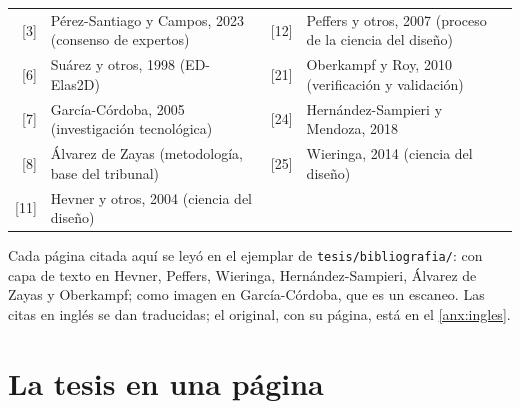 \documentclass[11pt,a4paper]{article}
\newcommand{\fte}[1]{\textcolor{tinta3}{#1}}
\begin{document}
\begin{center}\small
\begin{tabularx}{\linewidth}{@{}rXrX@{}}
\toprule
{[3]} & Pérez-Santiago y Campos, 2023 (consenso de expertos) & {[12]} & Peffers y otros, 2007 (proceso de la ciencia del diseño)\\
{[6]} & Suárez y otros, 1998 (ED-Elas2D) & {[21]} & Oberkampf y Roy, 2010 (verificación y validación)\\
{[7]} & García-Córdoba, 2005 (investigación tecnológica) & {[24]} & Hernández-Sampieri y Mendoza, 2018\\
{[8]} & Álvarez de Zayas (metodología, base del tribunal) & {[25]} & Wieringa, 2014 (ciencia del diseño)\\
{[11]} & Hevner y otros, 2004 (ciencia del diseño) & & \\
\bottomrule
\end{tabularx}
\end{center}

\fte{Cada página citada aquí se leyó en el ejemplar de \texttt{tesis/bibliografia/}: con capa de texto en Hevner, Peffers, Wieringa, Hernández-Sampieri, Álvarez de Zayas y Oberkampf; como imagen en García-Córdoba, que es un escaneo. Las citas en inglés se dan traducidas; el original, con su página, está en el \autoref{anx:ingles}.}

\section{La tesis en una página}\label{sec:una-pagina}
\end{document}
